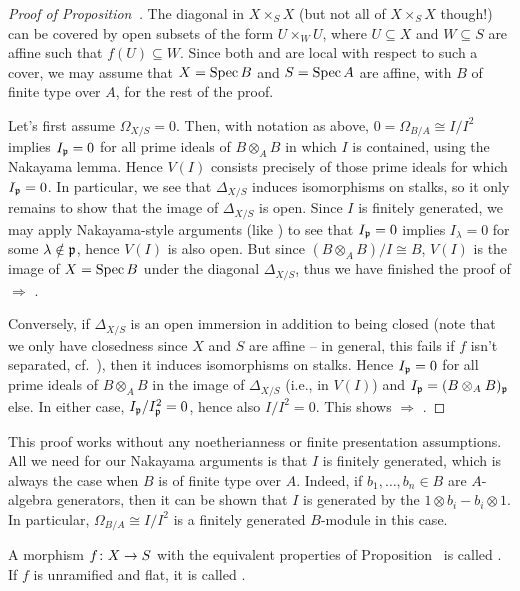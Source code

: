 \documentclass[a4paper,parskip=half,numbers=enddot, DIV=12]{scrreprt}
\begin{document}
\begin{proof}[Proof of Proposition~]
	The diagonal in $X\times_SX$ (but not all of $X\times_SX$ though!) can be covered by open subsets of the form $U\times_WU$, where $U\subseteq X$ and $W\subseteq S$ are affine such that $f(U)\subseteq W$. Since both  and  are local with respect to such a cover, we may assume that $X=\operatorname{Spec} B$ and $S=\operatorname{Spec} A$ are affine, with $B$ of finite type over $A$, for the rest of the proof.
	
	Let's first assume $\Omega_{X/S}=0$. Then, with notation as above, $0=\Omega_{B/A}\cong I/I^2$ implies $I_{\mathfrak{p}}=0$ for all prime ideals of $B\otimes_AB$ in which $I$ is contained, using the Nakayama lemma. Hence $V(I)$ consists precisely of those prime ideals for which $I_{\mathfrak{p}}=0$. In particular, we see that $\Delta_{X/S}$ induces isomorphisms on stalks, so it only remains to show that the image of $\Delta_{X/S}$ is open. Since $I$ is finitely generated, we may apply Nakayama-style arguments (like \cite[Lemma~1.5.1]{alg2}) to see that $I_{\mathfrak{p}}=0$ implies $I_\lambda=0$ for some $\lambda\notin\mathfrak{p}$, hence $V(I)$ is also open. But since $(B\otimes_AB)/I\cong B$, $V(I)$ is the image of $X=\operatorname{Spec} B$ under the diagonal $\Delta_{X/S}$, thus we have finished the proof of  $\Rightarrow$ .
	
	Conversely, if $\Delta_{X/S}$ is an open immersion in addition to being closed (note that we only have closedness since $X$ and $S$ are affine -- in general, this fails if $f$ isn't separated, cf.\ \cite[Fact~1.5.7]{alggeo1}), then it induces isomorphisms on stalks. Hence $I_{\mathfrak{p}}=0$ for all prime ideals of $B\otimes_AB$ in the image of $\Delta_{X/S}$ (i.e., in $V(I)$) and $I_{\mathfrak{p}}=(B\otimes_AB)_{\mathfrak{p}}$ else. In either case, $I_{\mathfrak{p}}/I_{\mathfrak{p}}^2=0$, hence also $I/I^2=0$. This shows  $\Rightarrow$ . 
\end{proof}
\begin{rem}
	This proof works without any noetherianness or finite presentation assumptions. All we need for our Nakayama arguments is that $I$ is finitely generated, which is always the case when $B$ is of finite type over $A$. Indeed, if $b_1,\ldots,b_n\in B$ are $A$-algebra generators, then it can be shown that $I$ is generated by the $1\otimes b_i-b_i\otimes 1$. In particular, $\Omega_{B/A}\cong I/I^2$ is a finitely generated $B$-module in this case.
\end{rem}
\begin{defi}
	A morphism $f\colon X\morphism S$ with the equivalent properties of Proposition~ is called . If $f$ is unramified and flat, it is called .
\end{defi}
\end{document}
